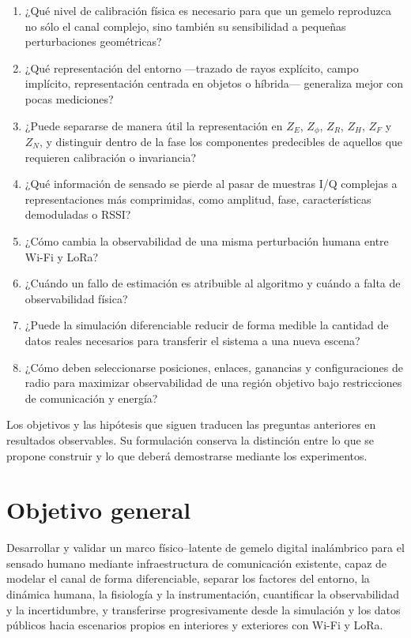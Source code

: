 \begin{enumerate}[label=\textbf{PI\arabic*:},leftmargin=3em]
\item ¿Qué nivel de calibración física es necesario para que un gemelo reproduzca no sólo el canal complejo, sino también su sensibilidad a pequeñas perturbaciones geométricas?
\item ¿Qué representación del entorno ---trazado de rayos explícito, campo implícito, representación centrada en objetos o híbrida--- generaliza mejor con pocas mediciones?
\item ¿Puede separarse de manera útil la representación en $Z_E$, $Z_\phi$, $Z_R$, $Z_H$, $Z_F$ y $Z_N$, y distinguir dentro de la fase los componentes predecibles de aquellos que requieren calibración o invariancia?
\item ¿Qué información de sensado se pierde al pasar de muestras I/Q complejas a representaciones más comprimidas, como amplitud, fase, características demoduladas o RSSI?
\item ¿Cómo cambia la observabilidad de una misma perturbación humana entre Wi-Fi y LoRa?
\item ¿Cuándo un fallo de estimación es atribuible al algoritmo y cuándo a falta de observabilidad física?
\item ¿Puede la simulación diferenciable reducir de forma medible la cantidad de datos reales necesarios para transferir el sistema a una nueva escena?
\item ¿Cómo deben seleccionarse posiciones, enlaces, ganancias y configuraciones de radio para maximizar observabilidad de una región objetivo bajo restricciones de comunicación y energía?
\end{enumerate}

Los objetivos y las hipótesis que siguen traducen las preguntas anteriores en resultados
observables. Su formulación conserva la distinción entre lo que se propone construir y lo
que deberá demostrarse mediante los experimentos.

\section{Objetivo general}

Desarrollar y validar un marco físico--latente de gemelo digital inalámbrico para el sensado humano mediante infraestructura de comunicación existente, capaz de modelar el canal de forma diferenciable, separar los factores del entorno, la dinámica humana, la fisiología y la instrumentación, cuantificar la observabilidad y la incertidumbre, y transferirse progresivamente desde la simulación y los datos públicos hacia escenarios propios en interiores y exteriores con Wi-Fi y LoRa.

